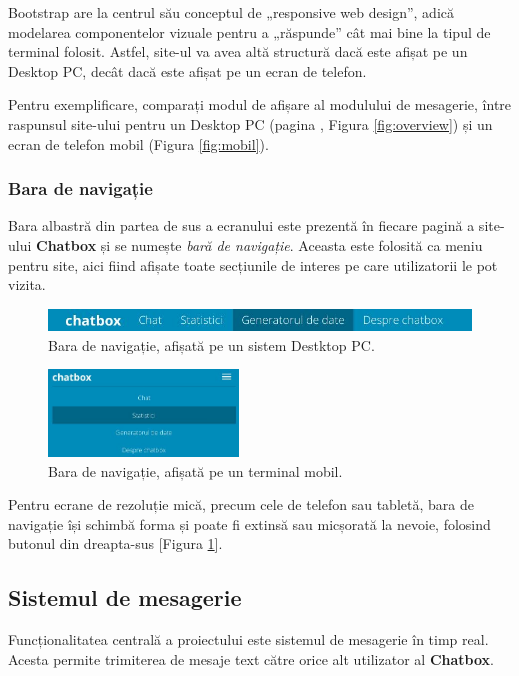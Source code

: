 \documentclass[12pt,a4paper]{article}
\begin{document}
Bootstrap are la centrul său conceptul de „responsive web design\cite{rwd}”, adică modelarea componentelor
vizuale pentru a „răspunde” cât mai bine la tipul de terminal folosit. Astfel, site-ul va avea altă structură dacă este afișat pe un Desktop PC, decât dacă este afișat pe un ecran de telefon.

Pentru exemplificare, comparați modul de afișare al modulului de mesagerie, între 
raspunsul site-ului pentru un Desktop PC (pagina \pageref{fig:overview}, Figura \ref{fig:overview}) și un ecran de telefon mobil (Figura \ref{fig:mobil}).

\subsubsection{Bara de navigație}
Bara albastră din partea de sus a ecranului este prezentă în fiecare pagină  
a site-ului \textbf{Chatbox} și se numește \textit{bară de navigație}. Aceasta 
este folosită ca meniu pentru site, aici fiind afișate toate secțiunile de interes
pe care utilizatorii le pot vizita. 

\begin{figure}[!h]
	\centering
	\includegraphics[width=\textwidth]{img/meniu_mare.jpg}
	\vspace{-15px}
	\caption{Bara de navigație, afișată pe un sistem Destktop PC.}
\end{figure}

\begin{figure}[!h]
	\centering
	\includegraphics[width=0.45\textwidth]{img/meniu_mobil.jpg}
	\caption{Bara de navigație, afișată pe un terminal mobil.}
	\label{fig:nav-mobil}
\end{figure}

Pentru ecrane de rezoluție mică, precum cele de telefon sau tabletă, 
bara de navigație își schimbă forma și poate fi extinsă sau micșorată la nevoie, 
folosind butonul din dreapta-sus [Figura \ref{fig:nav-mobil}].

\subsection{Sistemul de mesagerie}
Funcționalitatea centrală a proiectului este sistemul de mesagerie în timp real. 
Acesta permite trimiterea de mesaje text către orice alt utilizator al \textbf{Chatbox}.
\end{document}
